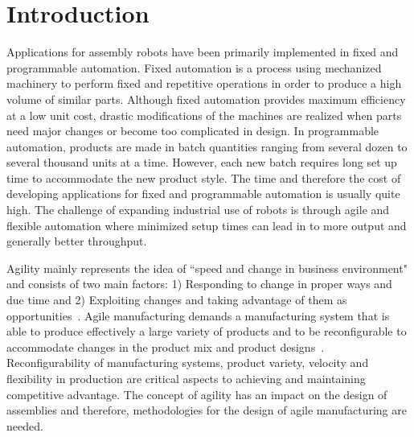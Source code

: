 \section{Introduction}

Applications for assembly robots have been primarily implemented in fixed and programmable automation. Fixed automation is a process using mechanized machinery to perform fixed and repetitive operations in order to produce a high volume of similar parts. Although fixed automation provides maximum efficiency at a low unit cost, drastic modifications of the machines are realized when parts need major changes or become too complicated in design. In programmable automation, products are made in batch quantities ranging from several dozen to several thousand units at a time. However, each new batch requires long set up time to accommodate the new product style. The time and therefore the cost of developing applications for fixed and programmable automation is usually quite high. The challenge of expanding industrial use of robots is through agile and flexible automation where minimized setup times can lead in to more output and generally better throughput.

Agility mainly represents the idea of ``speed and change in business environment" and consists of two main factors: 1) Responding to change in proper ways and due time and 2) Exploiting changes and taking advantage of them as opportunities~\cite{SHARIFI.1999}. Agile manufacturing demands a manufacturing system that is able to produce effectively a large variety of products and to be reconfigurable to accommodate changes in the product mix and product designs~\cite{GUNASEKARAN.1999}. Reconfigurability of manufacturing systems, product variety, velocity and flexibility in production are critical aspects to achieving and maintaining competitive advantage. The concept of agility has an impact on the design of assemblies and therefore, methodologies for the design of agile manufacturing are needed.


